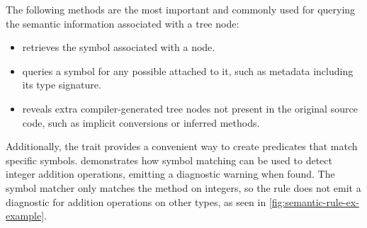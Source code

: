 \documentclass[../../main.tex]{subfiles}
\begin{document}
The following methods are the most important and commonly used for querying the semantic information associated with a tree node:
\begin{itemize}
  \item {} retrieves the symbol associated with a node.
  \item {} queries a symbol for any possible  attached to it, such as metadata including its type signature.
  \item {} reveals extra compiler-generated tree nodes not present in the original source code, such as implicit conversions or inferred  methods.
\end{itemize}
%
Additionally, the  trait provides a convenient way to create predicates that match specific symbols.
 demonstrates how symbol matching can be used to detect integer addition operations, emitting a diagnostic warning when found.
The  symbol matcher only matches the \scala{+} method on integers, so the rule does not emit a diagnostic for addition operations on other types, as seen in \cref{fig:semantic-rule-ex-example}.

\end{document}
